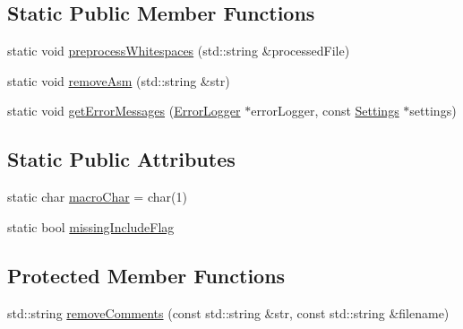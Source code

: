 \subsection*{Static Public Member Functions}
\begin{DoxyCompactItemize}
\item 
static void \hyperlink{class_preprocessor_a84e557dd17c15b81cbc4b35b0d6352d8}{preprocess\-Whitespaces} (std\-::string \&processed\-File)
\item 
static void \hyperlink{class_preprocessor_af456efe9fec8069057e34c09b612e755}{remove\-Asm} (std\-::string \&str)
\item 
static void \hyperlink{class_preprocessor_ad160c0188eac20a04a151908f473025e}{get\-Error\-Messages} (\hyperlink{class_error_logger}{Error\-Logger} $\ast$error\-Logger, const \hyperlink{class_settings}{Settings} $\ast$settings)
\end{DoxyCompactItemize}
\subsection*{Static Public Attributes}
\begin{DoxyCompactItemize}
\item 
static char \hyperlink{class_preprocessor_ae3ff55f4bd43ba3ef47d4d673f5c50fe}{macro\-Char} = char(1)
\item 
static bool \hyperlink{class_preprocessor_a3460bda4d7e3346862b19a45619a3fb4}{missing\-Include\-Flag}
\end{DoxyCompactItemize}
\subsection*{Protected Member Functions}
\begin{DoxyCompactItemize}
\item 
std\-::string \hyperlink{class_preprocessor_acfd2e29441f281c151964d3bf946f8de}{remove\-Comments} (const std\-::string \&str, const std\-::string \&filename)
\end{DoxyCompactItemize}
